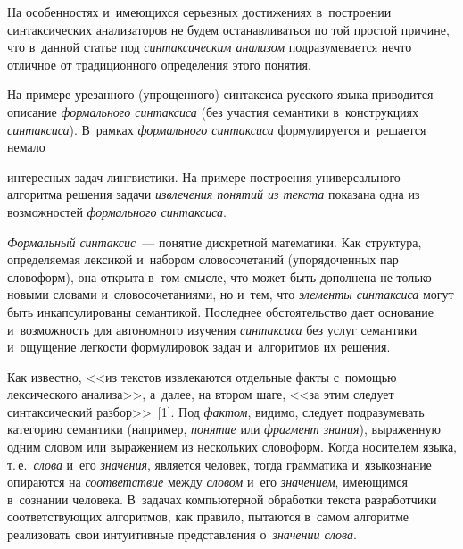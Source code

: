 \begin{multicols}{2}
     На особенностях и~име\-ющих\-ся серьезных достижениях в~построении 
синтаксических анализаторов не будем останавливаться по той прос\-той причине, 
что в~данной статье под \textit{синтаксическим анализом} подразумевается нечто 
отличное от традиционного определения этого понятия. 
     
     На примере урезанного (упрощенного) син\-таксиса русского языка 
приводится описание \textit{формаль\-но\-го синтаксиса} (без участия семантики 
в~конструкциях \textit{синтаксиса}). В~рамках \textit{формального синтаксиса} 
формулируется и~решается немало\linebreak\vspace*{-12pt}

\pagebreak

\noindent
 интересных задач линг\-ви\-сти\-ки. На примере 
построения универсального алгоритма решения задачи \textit{извлечения понятий 
из текста} показана одна из возможностей \textit{формального синтаксиса}.
     
     \textit{Формальный синтаксис}~--- понятие диск\-рет\-ной математики. Как 
структура, определяемая лексикой и~набором словосочетаний (упорядоченных 
пар словоформ), она открыта в~том смысле, что может быть дополнена не только 
новыми словами и~словосочетаниями, но и~тем, что \textit{элементы синтаксиса} 
могут быть инкапсулированы семантикой. Последнее обстоятельство дает 
основание и~воз\-мож\-ность для автономного изучения \textit{синтаксиса} без 
услуг семантики и~ощущение лег\-кости формулировок задач и~алгоритмов их 
решения.
     
     Как известно, <<из текстов извлекаются отдельные факты с~по\-мощью 
лексического анализа>>, а~далее, на втором шаге, <<за этим следует 
синтаксический разбор>>~[1]. Под \textit{фактом}, видимо, следует 
подразумевать категорию семантики (например, \textit{понятие} или 
\textit{фрагмент знания}), выраженную одним словом или выражением из 
нескольких словоформ. Когда носителем языка, т.\,е.\ \textit{слова} и~его 
\textit{значения}, является человек, тогда грамматика и~языкознание опираются на 
\textit{соответствие} между \textit{словом} и~его \textit{значением}, имеющимся 
в~сознании человека. В~задачах компьютерной обработки текс\-та разработчики 
со\-от\-вет\-ст\-ву\-ющих алгоритмов, как правило, пытаются в~самом алгоритме 
реализовать свои интуитивные пред\-став\-ле\-ния о~\textit{значении слова}. 
     

\end{multicols}

